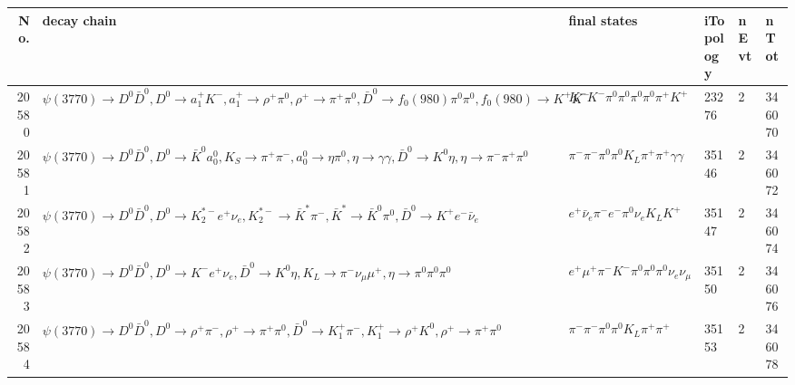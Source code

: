 \begin{table}[htbp] 
\begin{center}
\begin{small}
\begin{tabular}{rlllll}\hline\hline
 No. & decay chain & final states &  iTopology & nEvt & nTot \\\hline
20580&$\psi(3770) \rightarrow D^{0} \bar{D}^{0} , D^{0}  \rightarrow a_{1}^{+}      K^{-}          , a_{1}^{+}       \rightarrow \rho^{+}      \pi^{0}        , \rho^{+}       \rightarrow \pi^{+}        \pi^{0}        , \bar{D}^{0}  \rightarrow f_{0}(980)     \pi^{0}        \pi^{0}        , f_{0}(980)      \rightarrow K^{+}          K^{-}          $&$K^{-}          K^{-}          \pi^{0}        \pi^{0}        \pi^{0}        \pi^{0}        \pi^{+}        K^{+}          $&23276&    2&346070\\
20581&$\psi(3770) \rightarrow D^{0} \bar{D}^{0} , D^{0}  \rightarrow \bar{K}^{0}   a_{0}^{0}      , K_{S}           \rightarrow \pi^{+}        \pi^{-}        , a_{0}^{0}       \rightarrow \eta          \pi^{0}        , \eta           \rightarrow \gamma       \gamma       , \bar{D}^{0}  \rightarrow K^{0}          \eta          , \eta           \rightarrow \pi^{-}        \pi^{+}        \pi^{0}        $&$\pi^{-}        \pi^{-}        \pi^{0}        \pi^{0}        K_{L}          \pi^{+}        \pi^{+}        \gamma       \gamma       $&35146&    2&346072\\
20582&$\psi(3770) \rightarrow D^{0} \bar{D}^{0} , D^{0}  \rightarrow K_2^{*-}       e^{+}        \nu_{e}           , K_2^{*-}        \rightarrow \bar{K}^{*}   \pi^{-}        , \bar{K}^{*}    \rightarrow \bar{K}^{0}   \pi^{0}        , \bar{D}^{0}  \rightarrow K^{+}          e^{-}        \bar{\nu}_{e}    $&$e^{+}        \bar{\nu}_{e}    \pi^{-}        e^{-}        \pi^{0}        \nu_{e}           K_{L}          K^{+}          $&35147&    2&346074\\
20583&$\psi(3770) \rightarrow D^{0} \bar{D}^{0} , D^{0}  \rightarrow K^{-}          e^{+}        \nu_{e}           , \bar{D}^{0}  \rightarrow K^{0}          \eta          , K_{L}           \rightarrow \pi^{-}        \nu_{\mu}         \mu^{+}      , \eta           \rightarrow \pi^{0}        \pi^{0}        \pi^{0}        $&$e^{+}        \mu^{+}      \pi^{-}        K^{-}          \pi^{0}        \pi^{0}        \pi^{0}        \nu_{e}           \nu_{\mu}         $&35150&    2&346076\\
20584&$\psi(3770) \rightarrow D^{0} \bar{D}^{0} , D^{0}  \rightarrow \rho^{+}      \pi^{-}        , \rho^{+}       \rightarrow \pi^{+}        \pi^{0}        , \bar{D}^{0}  \rightarrow K_1^{+}        \pi^{-}        , K_1^{+}         \rightarrow \rho^{+}      K^{0}          , \rho^{+}       \rightarrow \pi^{+}        \pi^{0}        $&$\pi^{-}        \pi^{-}        \pi^{0}        \pi^{0}        K_{L}          \pi^{+}        \pi^{+}        $&35153&    2&346078\\

\end{tabular}
\end{small}
\end{center}
\end{table}
